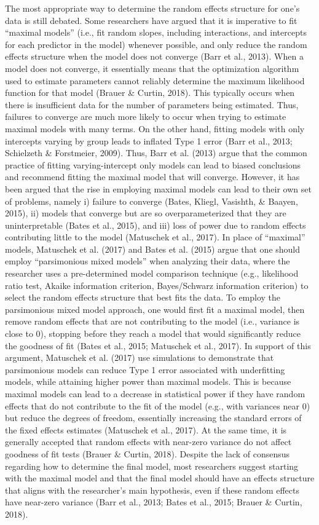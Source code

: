 \documentclass[
  english,
  man, noextraspace,floatsintext]{apa6}
\begin{document}
The most appropriate way to determine the random effects structure for one's data is still debated. Some researchers have argued that it is imperative to fit ``maximal models'' (i.e., fit random slopes, including interactions, and intercepts for each predictor in the model) whenever possible, and only reduce the random effects structure when the model does not converge (Barr et al., 2013). When a model does not converge, it essentially means that the optimization algorithm used to estimate parameters cannot reliably determine the maximum likelihood function for that model (Brauer \& Curtin, 2018). This typically occurs when there is insufficient data for the number of parameters being estimated. Thus, failures to converge are much more likely to occur when trying to estimate maximal models with many terms. On the other hand, fitting models with only intercepts varying by group leads to inflated Type 1 error (Barr et al., 2013; Schielzeth \& Forstmeier, 2009). Thus, Barr et al. (2013) argue that the common practice of fitting varying-intercept only models can lead to biased conclusions and recommend fitting the maximal model that will converge. However, it has been argued that the rise in employing maximal models can lead to their own set of problems, namely i) failure to converge (Bates, Kliegl, Vasishth, \& Baayen, 2015), ii) models that converge but are so overparameterized that they are uninterpretable (Bates et al., 2015), and iii) loss of power due to random effects contributing little to the model (Matuschek et al., 2017). In place of ``maximal'' models, Matuschek et al. (2017) and Bates et al. (2015) argue that one should employ ``parsimonious mixed models'' when analyzing their data, where the researcher uses a pre-determined model comparison technique (e.g., likelihood ratio test, Akaike information criterion, Bayes/Schwarz information criterion) to select the random effects structure that best fits the data. To employ the parsimonious mixed model approach, one would first fit a maximal model, then remove random effects that are not contributing to the model (i.e., variance is close to 0), stopping before they reach a model that would significantly reduce the goodness of fit (Bates et al., 2015; Matuschek et al., 2017). In support of this argument, Matuschek et al. (2017) use simulations to demonstrate that parsimonious models can reduce Type 1 error associated with underfitting models, while attaining higher power than maximal models. This is because maximal models can lead to a decrease in statistical power if they have random effects that do not contribute to the fit of the model (e.g., with variances near 0) but reduce the degrees of freedom, essentially increasing the standard errors of the fixed effects estimates (Matuschek et al., 2017). At the same time, it is generally accepted that random effects with near-zero variance do not affect goodness of fit tests (Brauer \& Curtin, 2018). Despite the lack of consensus regarding how to determine the final model, most researchers suggest starting with the maximal model and that the final model should have an effects structure that aligns with the researcher's main hypothesis, even if these random effects have near-zero variance (Barr et al., 2013; Bates et al., 2015; Brauer \& Curtin, 2018).
\end{document}
